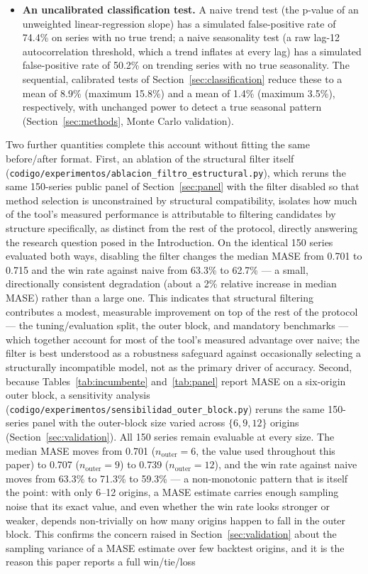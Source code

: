 \documentclass[forecasting,article,submit,pdftex,moreauthors]{Definitions/mdpi}
\begin{document}
\begin{itemize}
\item \textbf{An uncalibrated classification test.} A naive trend test (the p-value of an unweighted linear-regression slope) has a simulated false-positive rate of 74.4\% on series with no true trend; a naive seasonality test (a raw lag-12 autocorrelation threshold, which a trend inflates at every lag) has a simulated false-positive rate of 50.2\% on trending series with no true seasonality. The sequential, calibrated tests of Section~\ref{sec:classification} reduce these to a mean of 8.9\% (maximum 15.8\%) and a mean of 1.4\% (maximum 3.5\%), respectively, with unchanged power to detect a true seasonal pattern (Section~\ref{sec:methods}, Monte Carlo validation).
\end{itemize}

Two further quantities complete this account without fitting the same before/after format. First, an ablation of the structural filter itself (\texttt{codigo/\allowbreak experimentos/\allowbreak ablacion\_\allowbreak filtro\_\allowbreak estructural.py}), which reruns the same 150-series public panel of Section~\ref{sec:panel} with the filter disabled so that method selection is unconstrained by structural compatibility, isolates how much of the tool's measured performance is attributable to filtering candidates by structure specifically, as distinct from the rest of the protocol, directly answering the research question posed in the Introduction. On the identical 150 series evaluated both ways, disabling the filter changes the median MASE from 0.701 to 0.715 and the win rate against naive from 63.3\% to 62.7\% --- a small, directionally consistent degradation (about a 2\% relative increase in median MASE) rather than a large one. This indicates that structural filtering contributes a modest, measurable improvement on top of the rest of the protocol --- the tuning/evaluation split, the outer block, and mandatory benchmarks --- which together account for most of the tool's measured advantage over naive; the filter is best understood as a robustness safeguard against occasionally selecting a structurally incompatible model, not as the primary driver of accuracy. Second, because Tables~\ref{tab:incumbente} and~\ref{tab:panel} report MASE on a six-origin outer block, a sensitivity analysis (\texttt{codigo/\allowbreak experimentos/\allowbreak sensibilidad\_\allowbreak outer\_\allowbreak block.py}) reruns the same 150-series panel with the outer-block size varied across $\{6,9,12\}$ origins (Section~\ref{sec:validation}). All 150 series remain evaluable at every size. The median MASE moves from 0.701 ($n_{\text{outer}}=6$, the value used throughout this paper) to 0.707 ($n_{\text{outer}}=9$) to 0.739 ($n_{\text{outer}}=12$), and the win rate against naive moves from 63.3\% to 71.3\% to 59.3\% --- a non-monotonic pattern that is itself the point: with only 6--12 origins, a MASE estimate carries enough sampling noise that its exact value, and even whether the win rate looks stronger or weaker, depends non-trivially on how many origins happen to fall in the outer block. This confirms the concern raised in Section~\ref{sec:validation} about the sampling variance of a MASE estimate over few backtest origins, and it is the reason this paper reports a full win/tie/loss 
\end{document}
